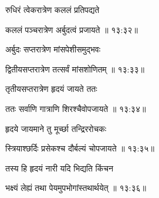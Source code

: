 {\devanagarifont रुधिरं त्वेकरात्रेण कललं प्रतिपद्यते \thinspace{\dandab} \dontdisplaylinenum }%
 

{\devanagarifont कललं पञ्चरात्रेण अर्बुदत्वं प्रजायते {॥ १३:३२॥} \veg\dontdisplaylinenum }%
 
{\devanagarifont अर्बुदः सप्तरात्रेण मांसपेशीसमुद्भवः \thinspace{\dandab} \dontdisplaylinenum }%
 

{\devanagarifont द्वितीयसप्तरात्रेण तत्सर्वं मांसशोणितम् {॥ १३:३३॥} \veg\dontdisplaylinenum }%

{\devanagarifont तृतीयसप्तरात्रेण हृदयं जायते ततः \thinspace{\dandab} \dontdisplaylinenum }%


{\devanagarifont ततः सर्वाणि गात्राणि शिरश्चैवोपजायते {॥ १३:३४॥} \veg\dontdisplaylinenum }%
 
{\devanagarifont हृदये जायमाने तु मूर्च्छा तन्द्रिररोचकः \thinspace{\dandab} \dontdisplaylinenum }%


{\devanagarifont स्त्रियाश्छर्दिः प्रसेकश्च दौर्बल्यं चोपजायते {॥ १३:३५॥} \veg\dontdisplaylinenum }%

{\devanagarifont तस्य हि हृदयं नारी यदि भिद्यति किंचन \thinspace{\dandab} \dontdisplaylinenum }%


{\devanagarifont भक्ष्यं लेह्यं तथा पेयमुपभोगांस्तथार्थयेत् {॥ १३:३६॥} \veg\dontdisplaylinenum }%

